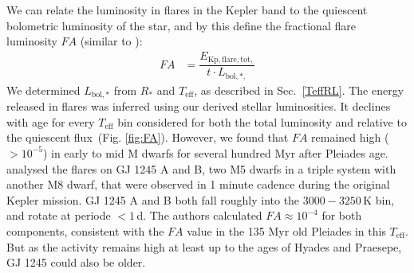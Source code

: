 \documentclass{aa}
\begin{document}
We can relate the luminosity in flares in the Kepler band to the quiescent bolometric luminosity of the star, and by this define the fractional flare luminosity $FA$ (similar to ):
\begin{align}
\label{eq:FA}
FA&=\dfrac{E_\mathrm{Kp,flare,tot,}}{t\cdot L_{\mathrm{bol,*,}}}
\end{align}
We determined $L_\mathrm{bol,*}$ from $R_*$ and $T_\mathrm{eff}$, as described in Sec.~\ref{TeffRL}. The energy released in flares was inferred using our derived stellar luminosities. It declines with age for every $T_\mathrm{eff}$ bin considered for both the total luminosity and relative to the quiescent flux~(Fig. \ref{fig:FA}). However, we found that $FA$ remained high ($>10^{-5}$) in early to mid M dwarfs for several hundred Myr after Pleiades age.
\\ 
\citet{lurie2015} analysed the flares on GJ 1245 A and B, two M5 dwarfs in a triple system with another M8 dwarf, that were observed in 1 minute cadence during the original Kepler mission. GJ 1245 A and B both fall roughly into the $3000-3250\,$K bin, and rotate at periode $<1$\,d. The authors calculated $FA\approx 10^{-4}$ for both components, consistent with the $FA$ value in the 135 Myr old Pleiades in this $T_\mathrm{eff}$. But as the activity remains high at least up to the ages of Hyades and Praesepe, GJ 1245 could also be older. %
\end{document}
